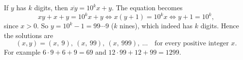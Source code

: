 If $y$ has $k$ digits, then $\overline{xy}=10^kx+y$. The equation becomes
\[xy+x+y=10^kx+y\iff x(y+1)=10^kx\iff y+1=10^k,\]
since $x>0$. So $y=10^k-1=99\cdots9$ ($k$ nines), which indeed has $k$ digits. Hence the solutions are
\[\boxed{(x,y)=(x,\ 9),\ (x,\ 99),\ (x,\ 999),\ \dots\quad\text{for every positive integer }x}.\]
For example $6\cdot9+6+9=69$ and $12\cdot99+12+99=1299$.
